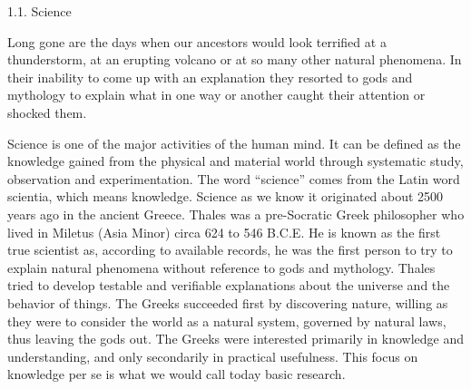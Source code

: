         1.1. Science

Long gone are the days when our ancestors would look terrified at a thunderstorm, at an erupting volcano or at so many other natural phenomena. In their inability to come up with an explanation they resorted to gods and mythology to explain what in one way or another caught their attention or shocked them.

Science is one of the major activities of the human mind. It can be defined as the knowledge gained from the physical and material world through systematic study, observation and experimentation. The word ``science'' comes from the Latin word scientia, which means knowledge. Science as we know it originated about 2500 years ago in the ancient Greece. Thales was a pre-Socratic Greek philosopher who lived in Miletus (Asia Minor) circa 624 to 546 B.C.E. He is known as the first true scientist as, according to available records, he was the first person to try to explain natural phenomena without reference to gods and mythology. Thales tried to develop testable and verifiable explanations about the universe and the behavior of things. The Greeks succeeded first by discovering nature, willing as they were to consider the world as a natural system, governed by natural laws, thus leaving the gods out. The Greeks were interested primarily in knowledge and understanding, and only secondarily in practical usefulness. This focus on knowledge per se is what we would call today basic research.

